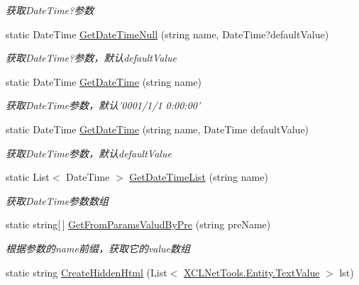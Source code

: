 \begin{DoxyCompactItemize}
\begin{DoxyCompactList}\small\item\em 获取\-Date\-Time?参数 \end{DoxyCompactList}\item 
static Date\-Time \hyperlink{class_x_c_l_net_tools_1_1_string_hander_1_1_form_helper_afd47b664fbbce54d65a5e06ec963ddfd}{Get\-Date\-Time\-Null} (string name, Date\-Time?default\-Value)
\begin{DoxyCompactList}\small\item\em 获取\-Date\-Time?参数，默认default\-Value \end{DoxyCompactList}\item 
static Date\-Time \hyperlink{class_x_c_l_net_tools_1_1_string_hander_1_1_form_helper_ab9b36d4dac916c94303c01b1006bc558}{Get\-Date\-Time} (string name)
\begin{DoxyCompactList}\small\item\em 获取\-Date\-Time参数，默认'0001/1/1 0\-:00\-:00' \end{DoxyCompactList}\item 
static Date\-Time \hyperlink{class_x_c_l_net_tools_1_1_string_hander_1_1_form_helper_adf1ee0dea579cc0333567e9523070ce4}{Get\-Date\-Time} (string name, Date\-Time default\-Value)
\begin{DoxyCompactList}\small\item\em 获取\-Date\-Time参数，默认default\-Value \end{DoxyCompactList}\item 
static List$<$ Date\-Time $>$ \hyperlink{class_x_c_l_net_tools_1_1_string_hander_1_1_form_helper_a5f45de423709334dacacc84764ac9079}{Get\-Date\-Time\-List} (string name)
\begin{DoxyCompactList}\small\item\em 获取\-Date\-Time参数数组 \end{DoxyCompactList}\item 
static string\mbox{[}$\,$\mbox{]} \hyperlink{class_x_c_l_net_tools_1_1_string_hander_1_1_form_helper_a5b0bd096fa3caa418a65570579394201}{Get\-From\-Params\-Valud\-By\-Pre} (string pre\-Name)
\begin{DoxyCompactList}\small\item\em 根据参数的name前缀，获取它的value数组 \end{DoxyCompactList}\item 
static string \hyperlink{class_x_c_l_net_tools_1_1_string_hander_1_1_form_helper_ae6425dda60cd7288371433985e8edb00}{Create\-Hidden\-Html} (List$<$ \hyperlink{class_x_c_l_net_tools_1_1_entity_1_1_text_value}{X\-C\-L\-Net\-Tools.\-Entity.\-Text\-Value} $>$ lst)

\end{DoxyCompactItemize}
